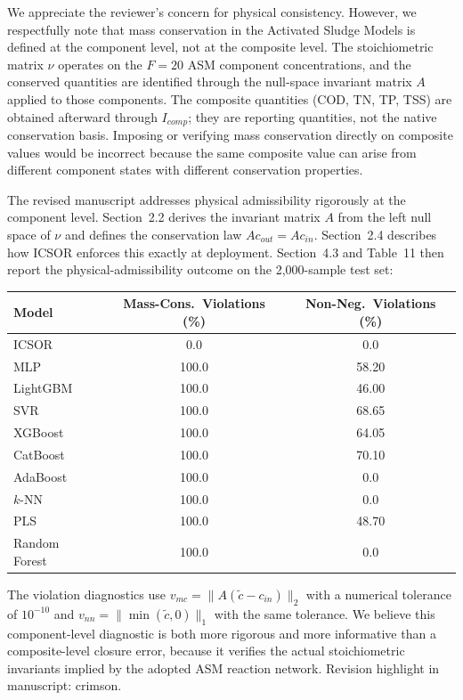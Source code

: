 \documentclass[a4paper,11pt]{article}
\newcommand{\revhighlight}[2]{\textcolor{#1}{Revision highlight in manuscript: #2.}}
\begin{document}
We appreciate the reviewer's concern for physical consistency. However, we respectfully note that mass conservation in the Activated Sludge Models is defined at the component level, not at the composite level. The stoichiometric matrix $\nu$ operates on the $F = 20$ ASM component concentrations, and the conserved quantities are identified through the null-space invariant matrix $A$ applied to those components. The composite quantities (COD, TN, TP, TSS) are obtained afterward through $I_{comp}$; they are reporting quantities, not the native conservation basis. Imposing or verifying mass conservation directly on composite values would be incorrect because the same composite value can arise from different component states with different conservation properties.

The revised manuscript addresses physical admissibility rigorously at the component level. Section~2.2 derives the invariant matrix $A$ from the left null space of $\nu$ and defines the conservation law $Ac_{out} = Ac_{in}$. Section~2.4 describes how ICSOR enforces this exactly at deployment. Section~4.3 and Table~11 then report the physical-admissibility outcome on the 2,000-sample test set:

\begin{center}
\small
\begin{tabular}{lcc}
\toprule
Model & Mass-Cons.\ Violations (\%) & Non-Neg.\ Violations (\%) \\
\midrule
ICSOR & 0.0 & 0.0 \\
MLP & 100.0 & 58.20 \\
LightGBM & 100.0 & 46.00 \\
SVR & 100.0 & 68.65 \\
XGBoost & 100.0 & 64.05 \\
CatBoost & 100.0 & 70.10 \\
AdaBoost & 100.0 & 0.0 \\
$k$-NN & 100.0 & 0.0 \\
PLS & 100.0 & 48.70 \\
Random Forest & 100.0 & 0.0 \\
\bottomrule
\end{tabular}
\end{center}

The violation diagnostics use $v_{mc} = \|A(\tilde{c} - c_{in})\|_2$ with a numerical tolerance of $10^{-10}$ and $v_{nn} = \|\min(\tilde{c}, 0)\|_1$ with the same tolerance. We believe this component-level diagnostic is both more rigorous and more informative than a composite-level closure error, because it verifies the actual stoichiometric invariants implied by the adopted ASM reaction network. \revhighlight{revRtwoTwo}{crimson}
\end{document}
